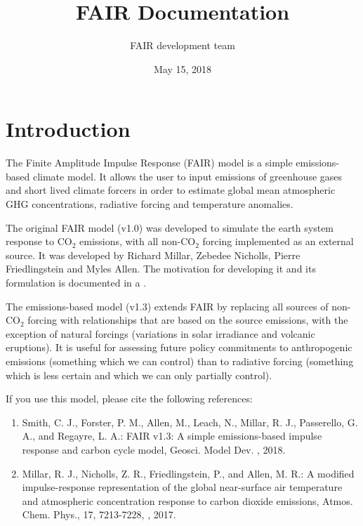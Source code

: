 \documentclass[letterpaper,10pt,english]{sphinxmanual}
\title{FAIR Documentation}
\date{May 15, 2018}
\author{FAIR development team}
\begin{document}
\maketitle
\sphinxtableofcontents
{}\label{\detokenize{index::doc}}



\chapter{Introduction}
\label{\detokenize{intro:introduction}}\label{\detokenize{intro:fair-finite-amplitude-impulse-response-simple-climate-model}}\label{\detokenize{intro::doc}}
The Finite Amplitude Impulse Response (FAIR) model is a simple
emissions-based climate model. It allows the user to input emissions of
greenhouse gases and short lived climate forcers in order to estimate
global mean atmospheric GHG concentrations, radiative forcing and
temperature anomalies.

The original FAIR model (v1.0) was developed to simulate the earth
system response to CO$_{\text{2}}$ emissions, with all non-CO$_{\text{2}}$ forcing implemented as an \sphinxquotedblleft{}external\sphinxquotedblright{} source. It was developed by Richard
Millar, Zebedee Nicholls, Pierre Friedlingstein and Myles Allen. The
motivation for developing it and its formulation is documented in a
.

The emissions-based model (v1.3) extends FAIR by replacing all sources of
non-CO$_{\text{2}}$ forcing with relationships that are based on the
source emissions, with the exception of natural forcings (variations
in solar irradiance and volcanic eruptions). It is useful for
assessing future policy commitments to anthropogenic emissions
(something which we can control) than to radiative forcing (something
which is less certain and which we can only partially control).

If you use this model, please cite the following references:
\begin{enumerate}
\item {} 
Smith, C. J., Forster, P. M., Allen, M., Leach, N., Millar, R. J., Passerello, G. A., and Regayre, L. A.: FAIR v1.3: A simple emissions-based impulse response and carbon cycle model, Geosci. Model Dev. , 2018.

\item {} 
Millar, R. J., Nicholls, Z. R., Friedlingstein, P., and Allen, M. R.: A modified impulse-response representation of the global near-surface air temperature and atmospheric concentration response to carbon dioxide emissions, Atmos. Chem. Phys., 17, 7213-7228, , 2017.

\end{enumerate}
\end{document}
